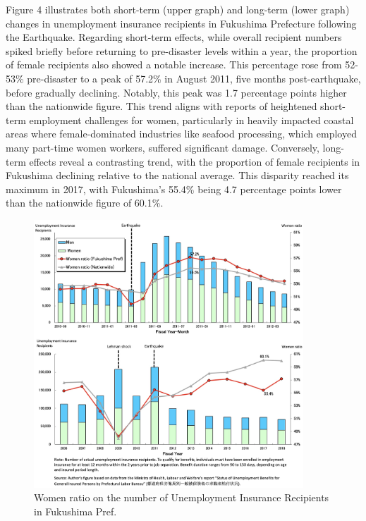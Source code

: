 \documentclass[12pt,halfline,a4paper]{ouparticle}
\begin{document}
Figure 4 illustrates both short-term (upper graph) and long-term (lower graph) changes in unemployment insurance recipients in Fukushima Prefecture following the Earthquake. Regarding short-term effects, while overall recipient numbers spiked briefly before returning to pre-disaster levels within a year, the proportion of female recipients also showed a notable increase. This percentage rose from 52-53\% pre-disaster to a peak of 57.2\% in August 2011, five months post-earthquake, before gradually declining. Notably, this peak was 1.7 percentage points higher than the nationwide figure. This trend aligns with reports of heightened short-term employment challenges for women, particularly in heavily impacted coastal areas where female-dominated industries like seafood processing, which employed many part-time women workers, suffered significant damage. Conversely, long-term effects reveal a contrasting trend, with the proportion of female recipients in Fukushima declining relative to the national average. This disparity reached its maximum in 2017, with Fukushima's 55.4\% being 4.7 percentage points lower than the nationwide figure of 60.1\%.


\begin{figure}[h!]
    \centering
    \includegraphics[width=0.9\textwidth]{Number of Actual Unemployment Insurance Recipients2.jpeg}  %
    \caption{Women ratio on the number of Unemployment Insurance Recipients in Fukushima Pref.}
    \label{fig:women_ratio_fukushima}
\end{figure}
\end{document}
